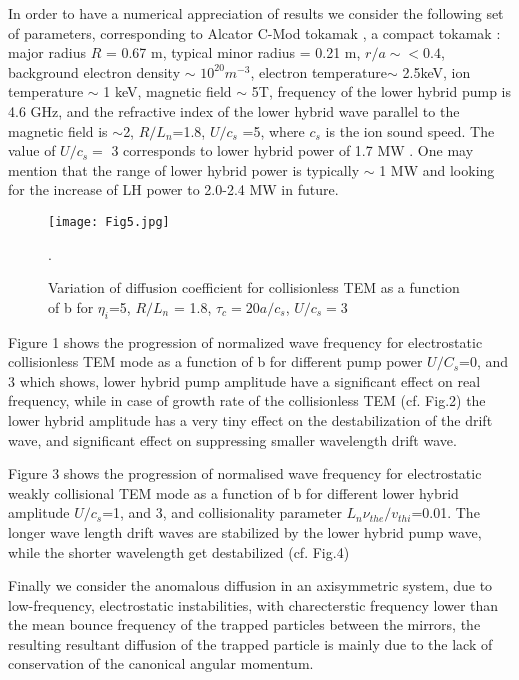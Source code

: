 \documentclass[aip,pop,amsmath,amssymb,showpacs,reprint,floatfix,lengthcheck]{revtex4-1}
\begin{document}
In order to have a numerical appreciation of results we consider the following set of parameters, corresponding to Alcator C-Mod tokamak \cite{PhysRevLett.102.035002}, a compact tokamak : major radius $R$ = 0.67 m, typical minor radius = 0.21 m, $r/a\sim<0.4$, background electron density $\sim$ $10^{20} m^{-3}$, electron temperature$\sim$ 2.5keV, ion temperature $\sim$ 1 keV, magnetic field $\sim$ 5T, frequency of the lower hybrid pump is 4.6 GHz, and the refractive index of the lower hybrid wave parallel to the magnetic field is $\sim$2, $R/L_{n}$=1.8,  $U/c_{s}$ =5, where $c_{s}$ is the ion sound speed. The value of $U/c_{s}=$  3 corresponds to lower hybrid power of 1.7 MW \cite{liu1984density}. One may mention that the range of lower hybrid power is typically $\sim$ 1 MW and looking for the increase of LH power to 2.0-2.4 MW in future.
\begin{figure}
 \centering
 \texttt{[image: Fig5.jpg]}
 \caption{Variation of diffusion coefficient for collisionless TEM as a function of b for $\eta_{i}$=5, $R/L_{n}$ = 1.8, $\tau_{c}=20a/c_{s}$, $U/c_{s}=3$}.
 \label{fig:5}
\end{figure}

Figure 1 shows the progression of normalized wave frequency for electrostatic collisionless TEM mode as a function of b for different pump power $U/C_{s}$=0, and 3 which shows, lower hybrid pump amplitude have a significant effect on real frequency, while in case of growth rate of the collisionless TEM (cf. Fig.2) the lower hybrid amplitude has a very tiny effect on the destabilization of the drift wave, and significant effect on suppressing smaller wavelength drift wave.  

Figure 3 shows the progression of normalised wave frequency for electrostatic weakly collisional TEM mode as a function of b for different lower hybrid amplitude $U/c_{s}$=1, and 3, and collisionality parameter $L_{n}\nu_{the}/v_{thi}$=0.01. The longer wave length drift waves are stabilized by the lower hybrid pump wave, while the shorter wavelength get destabilized (cf. Fig.4)

Finally we consider the anomalous diffusion in an axisymmetric system, due to low-frequency, electrostatic instabilities, with charecterstic frequency lower than the mean bounce frequency of the trapped particles between the mirrors, the resulting resultant diffusion of the trapped particle is mainly due to the lack of conservation of the canonical angular momentum.
\end{document}
